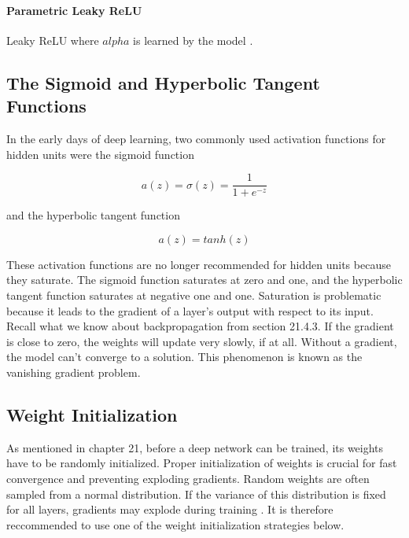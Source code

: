 \documentclass{article}
\begin{document}
\paragraph{Parametric Leaky ReLU}Leaky ReLU where \(alpha\) is learned by the model \cite{hands-on-ml}.

\subsection{The Sigmoid and Hyperbolic Tangent Functions}

In the early days of deep learning, two commonly used activation functions for hidden units were the sigmoid function

\begin{equation}
    a(z) = \sigma (z) = \frac{1}{1 + e^{-z}}
    \label{sigmoid-activation}
\end{equation}

and the hyperbolic tangent function

\begin{equation}
    a(z) = tanh(z)
    \label{tanh-activation}
\end{equation}

These activation functions are no longer recommended for hidden units because they saturate. The sigmoid function saturates at zero and one, and the hyperbolic tangent function saturates at  negative one and one. Saturation is problematic because it leads to the gradient of a layer's output with respect to its input. Recall what we know about backpropagation from section 21.4.3. If the gradient is close to zero, the weights will update very slowly, if at all. Without a gradient, the model can't converge to a solution. This phenomenon is known as the vanishing gradient problem.

\subsection{Weight Initialization} %

As mentioned in chapter 21, before a deep network can be trained, its weights have to be randomly initialized. Proper initialization of weights is crucial for fast convergence and preventing exploding gradients. Random weights are often sampled from a normal distribution. If the variance of this distribution is fixed for all layers, gradients may explode during training \cite{pml1book}. It is therefore reccommended to use one of the weight initialization strategies below.
\end{document}
